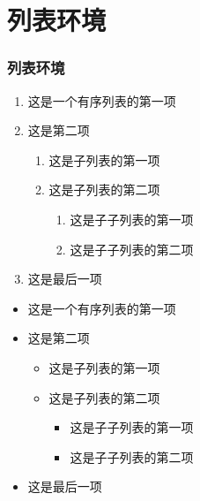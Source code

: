
\section{列表环境}
\begin{frame}
\frametitle{列表环境}
\begin{enumerate}
  \item 这是一个有序列表的第一项
  \item 这是第二项
  \begin{enumerate}
    \item 这是子列表的第一项
    \item 这是子列表的第二项
    \begin{enumerate}
      \item 这是子子列表的第一项
      \item 这是子子列表的第二项
    \end{enumerate}
  \end{enumerate}
  \item 这是最后一项
\end{enumerate}

\begin{itemize}
  \item 这是一个有序列表的第一项
  \item 这是第二项
  \begin{itemize}
    \item 这是子列表的第一项
    \item 这是子列表的第二项
    \begin{itemize}
      \item 这是子子列表的第一项
      \item 这是子子列表的第二项
    \end{itemize}
  \end{itemize}
  \item 这是最后一项
\end{itemize}

\end{frame}